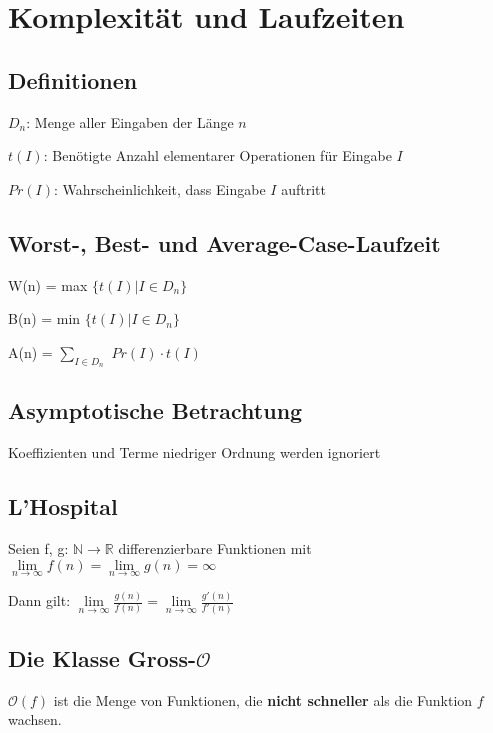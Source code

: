 \documentclass[12pt]{article}
\begin{document}
\parindent=0pt

\tableofcontents
\clearpage
{}

\section{Komplexität und Laufzeiten}

\subsection{Definitionen}
$D_n$: Menge aller Eingaben der Länge $n$

$t(I)$: Benötigte Anzahl elementarer Operationen für Eingabe $I$

$Pr(I)$: Wahrscheinlichkeit, dass Eingabe $I$ auftritt

\subsection{Worst-, Best- und Average-Case-Laufzeit}

W(n) = max $\{ t(I) | I \in D_n \}$

B(n) = min $\{ t(I) | I \in D_n \}$

A(n) = $\sum_{I \in D_{n}}$ $Pr(I) \cdot{} t(I)$

\subsection{Asymptotische Betrachtung}

Koeffizienten und Terme niedriger Ordnung werden ignoriert

\subsection{L'Hospital}

Seien f, g: $\mathbb{N} \to \mathbb{R}$ differenzierbare Funktionen mit \(\lim\limits_{n \to \infty}f(n)=\lim\limits_{n \to \infty}g(n)=\infty\)

Dann gilt: \(\lim\limits_{n \to \infty}\frac{g(n)}{f(n)}=\lim\limits_{n \to \infty}\frac{g'(n)}{f'(n)}\)

\subsection{Die Klasse Gross-$\mathcal O$}

$\mathcal O(f)$ ist die Menge von Funktionen, die \textbf{nicht schneller} als die Funktion $f$ wachsen.
\end{document}
